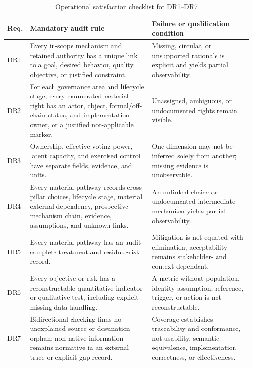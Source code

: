 \documentclass[10pt]{article}
\begin{document}
\begin{table}[h]
\caption{Operational satisfaction checklist for DR1--DR7}
\centering
\small
\begin{tabularx}{\linewidth}{@{}p{.07\linewidth}Yp{.31\linewidth}@{}}
\toprule
Req. & Mandatory audit rule & Failure or qualification condition \\
\midrule
DR1 & Every in-scope mechanism and retained authority has a unique link to a goal, desired behavior, quality objective, or justified constraint. & Missing, circular, or unsupported rationale is explicit and yields partial observability. \\
DR2 & For each governance area and lifecycle stage, every enumerated material right has an actor, object, formal/off-chain status, and implementation owner, or a justified not-applicable marker. & Unassigned, ambiguous, or undocumented rights remain visible. \\
DR3 & Ownership, effective voting power, latent capacity, and exercised control have separate fields, evidence, and units. & One dimension may not be inferred solely from another; missing evidence is unobservable. \\
DR4 & Every material pathway records cross-pillar choices, lifecycle stage, material external dependency, prospective mechanism chain, evidence, assumptions, and unknown links. & An unlinked choice or undocumented intermediate mechanism yields partial observability. \\
DR5 & Every material pathway has an audit-complete treatment and residual-risk record. & Mitigation is not equated with elimination; acceptability remains stakeholder- and context-dependent. \\
DR6 & Every objective or risk has a reconstructable quantitative indicator or qualitative test, including explicit missing-data handling. & A metric without population, identity assumption, reference, trigger, or action is not reconstructable. \\
DR7 & Bidirectional checking finds no unexplained source or destination orphan; non-native information remains normative in an external trace or explicit gap record. & Coverage establishes traceability and conformance, not usability, semantic equivalence, implementation correctness, or effectiveness. \\
\bottomrule
\end{tabularx}
\end{table}
\end{document}
